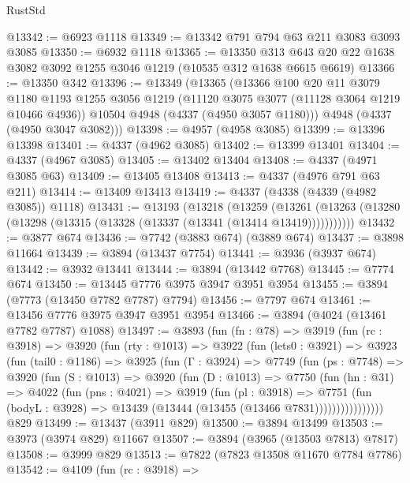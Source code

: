 \begin{lexlean}{RustStd}
\begin{coremodule}
@13342 := @6923 @1118
@13349 := @13342 @791 @794 @63 @211 @3083 @3093 @3085
@13350 := @6932 @1118
@13365 := @13350
    @313
    @643
    @20
    @22
    @1638
    @3082
    @3092
    @1255
    @3046
    @1219
    (@10535 @312 @1638 @6615 @6619)
@13366 := @13350 @342
@13396 := @13349
    (@13365
      (@13366
        @100
        @20
        @11
        @3079
        @1180
        @1193
        @1255
        @3056
        @1219
        (@11120 @3075 @3077 (@11128 @3064 @1219 @10466 @4936))
        @10504
        @4948
        (@4337 (@4950 @3057 @1180)))
      @4948
      (@4337 (@4950 @3047 @3082)))
@13398 := @4957 (@4958 @3085)
@13399 := @13396 @13398
@13401 := @4337 (@4962 @3085)
@13402 := @13399 @13401
@13404 := @4337 (@4967 @3085)
@13405 := @13402 @13404
@13408 := @4337 (@4971 @3085 @63)
@13409 := @13405 @13408
@13413 := @4337 (@4976 @791 @63 @211)
@13414 := @13409 @13413
@13419 := @4337 (@4338 (@4339 (@4982 @3085)) @1118)
@13431 := @13193
    (@13218
      (@13259
        (@13261 (@13263 (@13280 (@13298 (@13315 (@13328 (@13337 (@13341 (@13414 @13419)))))))))))
@13432 := @3877 @674
@13436 := @7742 (@3883 @674) (@3889 @674)
@13437 := @3898 @11664
@13439 := @3894 (@13437 @7754)
@13441 := @3936 (@3937 @674)
@13442 := @3932 @13441
@13444 := @3894 (@13442 @7768)
@13445 := @7774 @674
@13450 := @13445 @7776 @3975 @3947 @3951 @3954
@13455 := @3894 (@7773 (@13450 @7782 @7787) @7794)
@13456 := @7797 @674
@13461 := @13456 @7776 @3975 @3947 @3951 @3954
@13466 := @3894 (@4024 (@13461 @7782 @7787) @1088)
@13497 := @3893
    (fun (fn : @78) =>
    @3919
      (fun (rc : @3918) =>
      @3920
        (fun (rty : @1013) =>
        @3922
          (fun (lets0 : @3921) =>
          @3923
            (fun (tail0 : @1186) =>
            @3925
              (fun (Γ : @3924) =>
              @7749
                (fun (ps : @7748) =>
                @3920
                  (fun (S : @1013) =>
                  @3920
                    (fun (D : @1013) =>
                    @7750
                      (fun (hn : @31) =>
                      @4022
                        (fun (pns : @4021) =>
                        @3919
                          (fun (pl : @3918) =>
                          @7751
                            (fun (bodyL : @3928) =>
                            @13439 (@13444 (@13455 (@13466 @7831))))))))))))))))
    @829
@13499 := @13437 (@3911 @829)
@13500 := @3894 @13499
@13503 := @3973 (@3974 @829) @11667
@13507 := @3894 (@3965 (@13503 @7813) @7817)
@13508 := @3999 @829
@13513 := @7822 (@7823 @13508 @11670 @7784 @7786)
@13542 := @4109
    (fun (rc : @3918) =>

\end{coremodule}
\end{lexlean}
